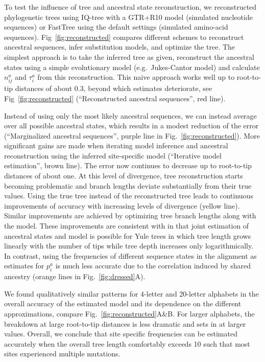 \documentclass[aps,rmp,twocolumn,linenumbers]{revtex4-1}
\newcommand{\eqp}{p}
\begin{document}
To test the influence of tree and ancestral state reconstruction, we reconstructed phylogenetic trees using IQ-tree \citep{nguyen_iq-tree:_2015} with a GTR+R10 model (simulated nucleotide sequences) or FastTree \citep{FastTree} using the default settings (simulated amino-acid sequences).
Fig~\ref{fig:reconstructed} compares different schemes to reconstruct ancestral sequences, infer substitution models, and optimize the tree.
The simplest approach is to take the inferred tree as given, reconstruct the ancestral states using a simple evolutionary model (e.g.~Jukes-Cantor model) and calculate $n^a_{ij}$ and $\tau_i^a$ from this reconstruction.
This naive approach works well up to root-to-tip distances of about 0.3, beyond which estimates deteriorate, see Fig~\ref{fig:reconstructed} (``Reconstructed ancestral sequences'', red line).


Instead of using only the most likely ancestral sequences, we can instead average over all possible ancestral states, which results in a modest reduction of the error (``Marginalized ancestral sequences'', purple line in Fig.~\ref{fig:reconstructed}).
More significant gains are made when iterating model inference and ancestral reconstruction using the inferred site-specific model (``Iterative model estimation'', brown line).
The error now continues to decrease up to root-to-tip distances of about one.
At this level of divergence, tree reconstruction starts becoming problematic and branch lengths deviate substantially from their true values.
Using the true tree instead of the reconstructed tree leads to continuous improvements of accuracy with increasing levels of divergence (yellow line).
Similar improvements are achieved by optimizing tree branch lengths along with the model.
These improvements are consistent with \citet{gascuel_darwinian_2020} in that joint estimation of ancestral states and model is possible for Yule trees in which tree length grows linearly with the number of tips while tree depth increases only logarithmically.
In contrast, using the frequencies of different sequence states in the alignment as estimates for $\eqp_i^a$ is much less accurate due to the correlation induced by shared ancestry (orange lines in Fig.~\ref{fig:dressed}A).

We found qualitatively similar patterns for 4-letter and 20-letter alphabets in the overall accuracy of the estimated model and its dependence on the different approximations, compare Fig.~\ref{fig:reconstructed}A\&B.
For larger alphabets, the breakdown at large root-to-tip distances is less dramatic and sets in at larger values.
Overall, we conclude that site specific frequencies can be estimated accurately when the overall tree length comfortably exceeds 10 such that most sites experienced multiple mutations.
\end{document}
